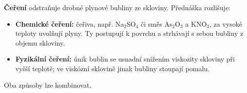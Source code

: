 \textbf{Čeření} odstraňuje drobné plynové bubliny ze skloviny. Přednáška rozlišuje:
\begin{itemize}
\item \textbf{Chemické čeření:} čeřiva, např. Na$_2$SO$_4$ či směs As$_2$O$_3$ a KNO$_3$, za vysoké teploty uvolňují plyny. Ty postupují k povrchu a strhávají s sebou bubliny z objemu skloviny.
\item \textbf{Fyzikální čeření:} únik bublin se usnadní snížením viskozity skloviny při vyšší teplotě; ve viskózní sklovině jinak bubliny stoupají pomalu.
\end{itemize}
Oba způsoby lze kombinovat.
